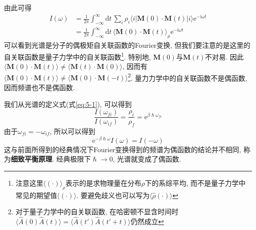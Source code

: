     由此可得
    \begin{equation}\begin{aligned}
        I(\omega) 
        &= \frac{1}{2\pi} \int_{-\infty}^{\infty} \mathrm{d}t\, \sum_{i} \rho_i \langle i|\bm{M}(0) \cdot \bm{M}(t) |i \rangle \mathrm{e}^{-\mathrm{i} \omega t} \\
        &= \frac{1}{2\pi} \int_{-\infty}^{\infty} \mathrm{d}t\, \langle \bm{M}(0) \cdot \bm{M}(t) \rangle_\rho \mathrm{e}^{-\mathrm{i} \omega t}
    \end{aligned}\end{equation}
    可以看到光谱是分子的偶极矩自关联函数的Fourier变换, 但我们要注意的是这里的自关联函数是量子力学中的自关联函数\footnote{注意这里$\langle (\cdot) \rangle_\rho$表示的是求物理量在分布$\rho$下的系综平均, 而不是量子力学中常见的期望值$\langle (\cdot) \rangle$. 要避免歧义也可以写为$\langle \hat\rho (\cdot) \rangle$}. 特别地, $\bm{M}(0)$与$\bm{M}(t)$不对易. 因此$\langle \bm{M}(0) \cdot \bm{M}(t) \rangle \neq \langle \bm{M}(t) \cdot \bm{M}(0) \rangle$, 因而有$\langle \bm{M}(0) \cdot \bm{M}(t) \rangle \neq \langle \bm{M}(0) \cdot \bm{M}(-t) \rangle$\footnote{对于量子力学中的自关联函数, 在哈密顿不显含时间时$\langle \hat A(0) \hat A(t) \rangle = \langle \hat A(t') \hat A(t'+t) \rangle$仍然成立}. 量力力学中的自关联函数不是偶函数, 因而频谱也不是偶函数.

    我们从光谱的定义式(式\ref{eq:5-1}), 可以得到
    \begin{equation}
        \frac{I(\omega_{fi})}{I(\omega_{if})} = \frac{\rho_i}{\rho_f} = \mathrm{e}^{\beta\hslash\omega_{fi}}
    \end{equation}
    由于$\omega_{fi} = - \omega_{if}$, 所以可以得到
    \begin{equation}
        \mathrm{e}^{-\beta \hslash \omega} I(\omega) = I(-\omega)
    \end{equation}
    这与前面所得到的经典情况下Fourier变换得到的频谱为偶函数的结论并不相同, 称为\textbf{细致平衡原理}. 经典极限下$\hslash \to 0$, 光谱就变成了偶函数. 
    
    
    